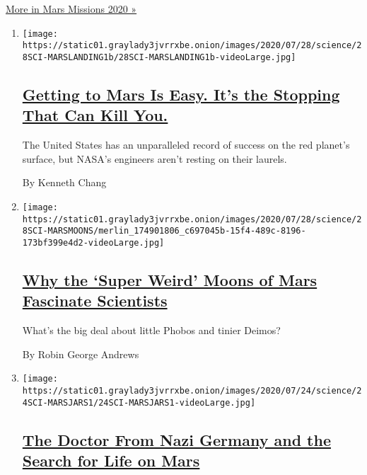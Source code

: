 \href{/news-event/summer-of-mars}{More in Mars Missions 2020 »}

\begin{enumerate}
\def\labelenumi{\arabic{enumi}.}
\item
  \texttt{[image: https://static01.graylady3jvrrxbe.onion/images/2020/07/28/science/28SCI-MARSLANDING1b/28SCI-MARSLANDING1b-videoLarge.jpg]}

  \hypertarget{getting-to-mars-is-easy-its-the-stopping-that-can-kill-you}{%
  \subsection{\texorpdfstring{\href{/2020/07/29/science/nasa-mars-perseverance-rover.html}{Getting
  to Mars Is Easy. It's the Stopping That Can Kill
  You.}}{Getting to Mars Is Easy. It's the Stopping That Can Kill You.}}\label{getting-to-mars-is-easy-its-the-stopping-that-can-kill-you}}

  The United States has an unparalleled record of success on the red
  planet's surface, but NASA's engineers aren't resting on their
  laurels.

  By Kenneth Chang
\item
  \texttt{[image: https://static01.graylady3jvrrxbe.onion/images/2020/07/28/science/28SCI-MARSMOONS/merlin\_174901806\_c697045b-15f4-489c-8196-173bf399e4d2-videoLarge.jpg]}

  \hypertarget{why-the-super-weird-moons-of-mars-fascinate-scientists}{%
  \subsection{\texorpdfstring{\href{/2020/07/25/science/mars-moons-phobos-deimos.html}{Why
  the `Super Weird' Moons of Mars Fascinate
  Scientists}}{Why the `Super Weird' Moons of Mars Fascinate Scientists}}\label{why-the-super-weird-moons-of-mars-fascinate-scientists}}

  What's the big deal about little Phobos and tinier Deimos?

  By Robin George Andrews
\item
  \texttt{[image: https://static01.graylady3jvrrxbe.onion/images/2020/07/24/science/24SCI-MARSJARS1/24SCI-MARSJARS1-videoLarge.jpg]}

  \hypertarget{the-doctor-from-nazi-germany-and-the-search-for-life-on-mars}{%
  \subsection{\texorpdfstring{\href{/2020/07/24/science/mars-jars-strughold.html}{The
  Doctor From Nazi Germany and the Search for Life on
  Mars}}{The Doctor From Nazi Germany and the Search for Life on Mars}}\label{the-doctor-from-nazi-germany-and-the-search-for-life-on-mars}}


\end{enumerate}
